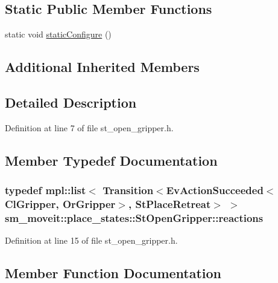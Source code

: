 \subsection*{Static Public Member Functions}
\begin{DoxyCompactItemize}
\item 
static void \hyperlink{structsm__moveit_1_1place__states_1_1StOpenGripper_a3a7ab2224ad0ca4c1e88d8432b0f37bf}{static\+Configure} ()
\end{DoxyCompactItemize}
\subsection*{Additional Inherited Members}


\subsection{Detailed Description}


Definition at line 7 of file st\+\_\+open\+\_\+gripper.\+h.



\subsection{Member Typedef Documentation}
\subsubsection[{\texorpdfstring{reactions}{reactions}}]{\setlength{\rightskip}{0pt plus 5cm}typedef mpl\+::list$<$ Transition$<$Ev\+Action\+Succeeded$<${\bf Cl\+Gripper}, {\bf Or\+Gripper}$>$, {\bf St\+Place\+Retreat}$>$ $>$ {\bf sm\+\_\+moveit\+::place\+\_\+states\+::\+St\+Open\+Gripper\+::reactions}}\hypertarget{structsm__moveit_1_1place__states_1_1StOpenGripper_ac79e4ee839e3fa0aaf17e97a146034a9}{}\label{structsm__moveit_1_1place__states_1_1StOpenGripper_ac79e4ee839e3fa0aaf17e97a146034a9}


Definition at line 15 of file st\+\_\+open\+\_\+gripper.\+h.



\subsection{Member Function Documentation}
